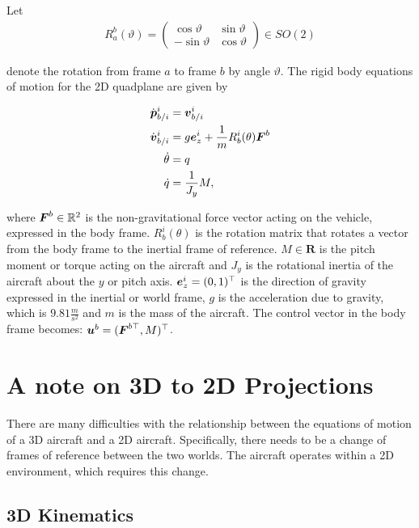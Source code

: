 Let
\begin{align}
R_a^b(\vartheta)=
\begin{pmatrix}
    \cos\vartheta & \sin\vartheta \\ -\sin\vartheta & \cos\vartheta
\end{pmatrix}
\in SO(2)
\end{align}

denote the rotation from frame $a$ to frame $b$ by angle $\vartheta$. The rigid body equations of motion for the 2D quadplane are given by

\begin{subequations}
\label{eq:evtol_kinematics}
\begin{align}
\dot{\boldsymbol{p}}_{b/i}^{i} &= \boldsymbol{v}_{b/i}^{i} \\
\dot{\boldsymbol{v}}_{b/i}^i &= g \boldsymbol{e}_z^i + \frac{1}{m} R_b^i(\theta) \boldsymbol{F}^b \\
\dot{\theta} &= q \\
\dot{q} &= \frac{1}{J_y} M,
\end{align}
\end{subequations}

where $\boldsymbol{F}^b \in \mathbb{R}^2$ is the non-gravitational force vector acting on the vehicle, expressed in the body frame. 
$R_b^i(\theta)$ is the rotation matrix that rotates a vector from the body frame to the inertial frame of reference. 
$M\in\mathbf{R}$ is the pitch moment or torque acting on the aircraft and $J_y$ is the rotational inertia of the aircraft about the $y$ or pitch axis. 
$\boldsymbol{e}_z^i=(0, 1)^\top$ is the direction of gravity expressed in the inertial or world frame, $g$ is the acceleration due to gravity, which is $9.81 \frac{m}{s^2}$ and $m$ is the mass of the aircraft. 
The control vector in the body frame becomes: $\boldsymbol{u}^b=(\boldsymbol{F}^{b\top}, M)^\top$.

\section{A note on 3D to 2D Projections}
\label{sec:projections}

There are many difficulties with the relationship between the equations of motion of a 3D aircraft and a 2D aircraft. 
Specifically, there needs to be a change of frames of reference between the two worlds. 
The aircraft operates within a 2D environment, which requires this change.

\subsection{3D Kinematics}

